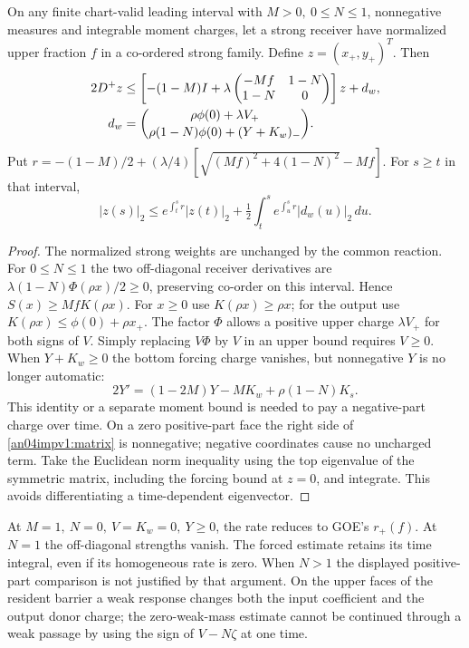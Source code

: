 \documentclass[11pt]{article}
\begin{document}
\begin{lemma}\label{an04impv1:ceiling}
On any finite chart-valid leading interval with \(M>0,\ 0\le N\le1\),
nonnegative measures and integrable moment charges, let a strong
receiver have normalized upper fraction \(f\) in a co-ordered strong
family. Define \(z=(x_+,y_+)^T\). Then
\begin{align}
 2D^+ z &\le
 \left[-(1-M)I+\lambda
 \begin{pmatrix}-Mf&1-N\\1-N&0\end{pmatrix}\right]z+d_w,
 \label{an04impv1:matrix}\\
 d_w&=\binom{\rho\phi(0)+\lambda V_+}
             {\rho(1-N)\phi(0)+(Y+K_w)_-}.\notag
\end{align}
Put \(r=-(1-M)/2+(\lambda/4)
[\sqrt{(Mf)^2+4(1-N)^2}-Mf]\). For \(s\ge t\) in that interval,
\[
 |z(s)|_2\le e^{\int_t^s r}|z(t)|_2+
      \tfrac12\int_t^s e^{\int_u^s r}|d_w(u)|_2\,du .
\]
\end{lemma}
\begin{proof}
The normalized strong weights are unchanged by the common reaction.
For \(0\le N\le1\) the two off-diagonal receiver derivatives are
\(\lambda(1-N)\Phi(\rho x)/2\ge0\), preserving co-order on this
interval. Hence \(S(x)\ge Mf K(\rho x)\).
For \(x\ge0\) use \(K(\rho x)\ge\rho x\); for the output use
\(K(\rho x)\le\phi(0)+\rho x_+\).
The factor \(\Phi\) allows a positive upper charge \(\lambda V_+\)
for both signs of \(V\). Simply replacing \(V\Phi\) by \(V\) in
an upper bound requires \(V\ge0\). When \(Y+K_w\ge0\) the bottom
forcing charge vanishes, but nonnegative \(Y\) is no longer automatic:
\[
 2Y'=(1-2M)Y-MK_w+\rho(1-N)K_s .
\]
This identity or a separate moment bound is needed to pay a
negative-part charge over time. On a zero positive-part face the
right side of \eqref{an04impv1:matrix} is nonnegative; negative
coordinates cause no uncharged term. Take the Euclidean norm
inequality using the top eigenvalue of the symmetric matrix,
including the forcing bound at \(z=0\), and integrate. This avoids
differentiating a time-dependent eigenvector.
\end{proof}
At \(M=1,\ N=0,\ V=K_w=0,\ Y\ge0\), the rate reduces to GOE's
\(r_+(f)\). At \(N=1\) the off-diagonal strengths vanish. The
forced estimate retains its time integral, even if its homogeneous
rate is zero. When \(N>1\) the displayed positive-part comparison
is not justified by that argument. On the upper faces of the resident
barrier a weak response changes both the input coefficient and the
output donor charge; the zero-weak-mass estimate cannot be continued
through a weak passage by using the sign of \(V-N\zeta\) at one time.
\end{document}
